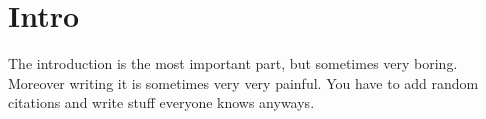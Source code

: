 \section{Intro}
The introduction is the most important part, but sometimes very boring. Moreover writing it is sometimes very very painful.
You have to add random citations and write stuff everyone knows anyways.
